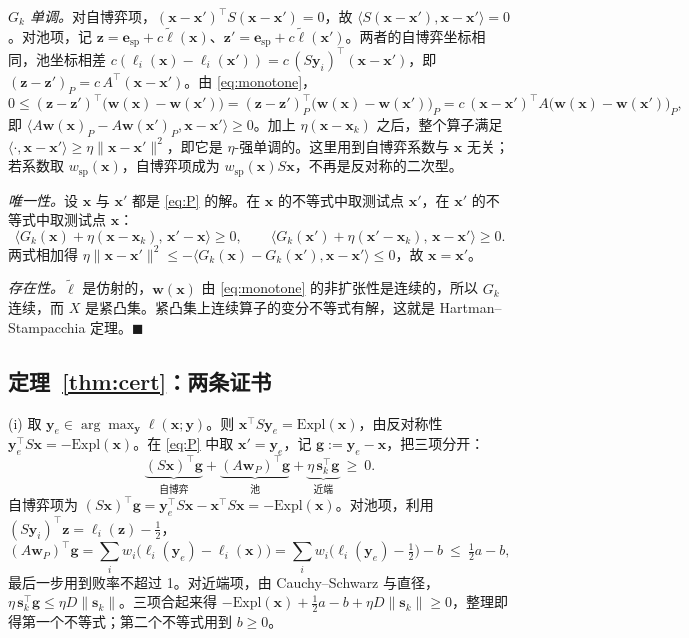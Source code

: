 \documentclass{article}
\theoremstyle{plain}
\theoremstyle{remark}
\newcommand{\Expl}{\mathrm{Expl}}
\newcommand{\bx}{{\bm{x}}}
\newcommand{\by}{{\bm{y}}}
\newcommand{\bw}{{\bm{w}}}
\newcommand{\bz}{{\bm{z}}}
\newcommand{\bg}{{\bm{g}}}
\newcommand{\be}{{\bm{e}}}
\newcommand{\bell}{{\bm{\ell}}}
\newcommand{\aug}{\tilde{\bell}}
\newcommand{\dx}{{\bm{s}}}
\newcommand{\esp}{\be_{\mathrm{sp}}}
\newcommand{\wsp}{w_{\mathrm{sp}}}
\begin{document}
\textit{$G_k$ 单调。}对自博弈项，$(\bx-\bx')^\top S(\bx-\bx')=0$，故 $\langle S(\bx-\bx'),\bx-\bx'\rangle=0$。对池项，记 $\bz=\esp+c\aug(\bx)$、$\bz'=\esp+c\aug(\bx')$。两者的自博弈坐标相同，池坐标相差 $c(\ell_i(\bx)-\ell_i(\bx'))=c\,(S\by_i)^\top(\bx-\bx')$，即 $(\bz-\bz')_P=c\,A^\top(\bx-\bx')$。由 \eqref{eq:monotone}，
\[
0\le(\bz-\bz')^\top\big(\bw(\bx)-\bw(\bx')\big)=(\bz-\bz')_P^\top\big(\bw(\bx)-\bw(\bx')\big)_P=c\,(\bx-\bx')^\top A\big(\bw(\bx)-\bw(\bx')\big)_P ,
\]
即 $\langle A\bw(\bx)_P-A\bw(\bx')_P,\bx-\bx'\rangle\ge0$。加上 $\eta(\bx-\bx_k)$ 之后，整个算子满足 $\langle\cdot,\bx-\bx'\rangle\ge\eta\|\bx-\bx'\|^2$，即它是 $\eta$-强单调的。这里用到自博弈系数与 $\bx$ 无关；若系数取 $\wsp(\bx)$，自博弈项成为 $\wsp(\bx)S\bx$，不再是反对称的二次型。

\textit{唯一性。}设 $\bx$ 与 $\bx'$ 都是 \eqref{eq:P} 的解。在 $\bx$ 的不等式中取测试点 $\bx'$，在 $\bx'$ 的不等式中取测试点 $\bx$：
\[
\langle G_k(\bx)+\eta(\bx-\bx_k),\,\bx'-\bx\rangle\ge0,\qquad\langle G_k(\bx')+\eta(\bx'-\bx_k),\,\bx-\bx'\rangle\ge0 .
\]
两式相加得 $\eta\|\bx-\bx'\|^2\le-\langle G_k(\bx)-G_k(\bx'),\bx-\bx'\rangle\le0$，故 $\bx=\bx'$。

\textit{存在性。}$\aug$ 是仿射的，$\bw(\bx)$ 由 \eqref{eq:monotone} 的非扩张性是连续的，所以 $G_k$ 连续，而 $X$ 是紧凸集。紧凸集上连续算子的变分不等式有解，这就是 Hartman--Stampacchia 定理\citep{hartman1966,facchinei2003vi}。\hfill$\blacksquare$

\subsection{定理~\ref{thm:cert}：两条证书}
\label{app:cert}

(i) 取 $\by_e\in\arg\max_\by\ell(\bx;\by)$。则 $\bx^\top S\by_e=\Expl(\bx)$，由反对称性 $\by_e^\top S\bx=-\Expl(\bx)$。在 \eqref{eq:P} 中取 $\bx'=\by_e$，记 $\bg:=\by_e-\bx$，把三项分开：
\[
\underbrace{(S\bx)^\top \bg}_{\text{自博弈}}+\underbrace{(A\bw_P)^\top \bg}_{\text{池}}+\underbrace{\eta\,\dx_k^\top \bg}_{\text{近端}}\ \ge\ 0 .
\]
自博弈项为 $(S\bx)^\top \bg=\by_e^\top S\bx-\bx^\top S\bx=-\Expl(\bx)$。对池项，利用 $(S\by_i)^\top \bz=\ell_i(\bz)-\tfrac12$，
\[
(A\bw_P)^\top \bg=\sum_iw_i\big(\ell_i(\by_e)-\ell_i(\bx)\big)=\sum_iw_i\big(\ell_i(\by_e)-\tfrac12\big)-b\ \le\ \tfrac12a-b ,
\]
最后一步用到败率不超过 1。对近端项，由 Cauchy--Schwarz 与直径，$\eta\,\dx_k^\top \bg\le\eta D\|\dx_k\|$。三项合起来得 $-\Expl(\bx)+\tfrac12a-b+\eta D\|\dx_k\|\ge0$，整理即得第一个不等式；第二个不等式用到 $b\ge0$。
\end{document}
